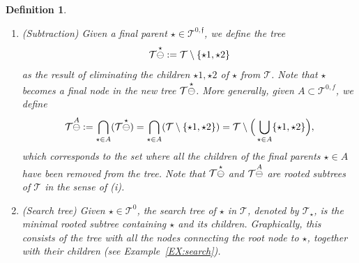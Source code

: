 \documentclass[%
11pt,  reqno]{amsart}
\makeatletter
\newcommand{\5}{\textup{V}}
\newtheorem{definition}[theorem]{Definition}
\theoremstyle{remark}
\newcommand{\TT}{\mathcal{T}}
\newcommand{\ff}{\mathfrak{f}}
\def\<#1>{\csname MH@symb@#1\endcsname}
\numberwithin{equation}{section}
\numberwithin{theorem}{section}
\makeatother
\begin{document}
\begin{definition}
\begin{enumerate}
\smallskip
\item[(iii)] (Subtraction) 
Given a final parent $\star  \in \TT^{0,\ff}$, we define the tree
$$
\TT \overset{\star }{\ominus } \<1>
: = \TT \setminus \{ \star1, \star2  \}
$$
as the result of eliminating the children $\star1, \star2$ of $\star$
from $\TT$. Note that $\star$ becomes a final node in the new tree $\TT \overset{\star}{\ominus } \<1>$. 
More generally, given $A\subset \TT^{0,f}$, we define
\begin{align}
\label{treeSubtr}
\TT \overset{A}{\ominus} \<1> : =
 \bigcap_{\star \in A} ( \TT \overset{\star}{\ominus}  \<1>)
= \bigcap_{\star\in A} (\TT \setminus \{\star1,\star2\})
= \TT \setminus \Big( \bigcup_{\star\in A} \{\star1,\star2\} \Big), 
\end{align}
which corresponds to the set where all the children of the final parents $\star\in A$ have been removed from the tree. Note that $\TT \overset{\star}{\ominus} \<1>$ and $\TT\overset{A}{\ominus} \<1>$ are rooted subtrees of $\TT$ in the sense of (i). 

\smallskip
\item[(iv)] (Search tree)
Given $\star\in \TT^0$, the \textit{search tree} of $\star$ in $\TT$, denoted by
$\TT_\star $, is the minimal rooted subtree containing $\star$ and its children. Graphically, this consists of the tree with all the nodes connecting the root node to $\star$, together with their children (see
Example~\ref{EX:search}). 


\end{enumerate}



\end{definition}
\end{document}
